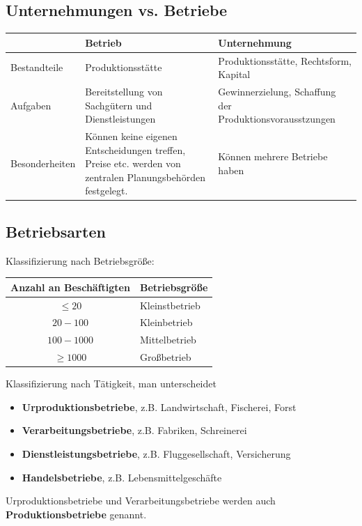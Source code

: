 \documentclass[titlepage,parskip=half]{scrartcl}
\begin{document}
\subsection{Unternehmungen vs. Betriebe}
\begin{tabularx}{\textwidth}{|l|X|X|} \hline
    & Betrieb & Unternehmung \\ \hline
    Bestandteile & Produktionsstätte & Produktionsstätte, Rechtsform, Kapital \\ \hline
    Aufgaben & Bereitstellung von Sachgütern und Dienstleistungen & Gewinnerzielung, Schaffung der Produktionsvorausstzungen \\ \hline
    Besonderheiten & Können keine eigenen Entscheidungen treffen, Preise etc. werden von zentralen Planungsbehörden festgelegt. & Können mehrere Betriebe haben \\ \hline
\end{tabularx}

\subsection{Betriebsarten}
Klassifizierung nach Betriebsgröße:

\begin{tabular}{|c|l|} \hline
    Anzahl an Beschäftigten & Betriebsgröße \\ \hline
    $\le20$ & Kleinstbetrieb  \\ \hline
    $20-100$ & Kleinbetrieb \\ \hline
    $100-1000$ & Mittelbetrieb \\ \hline
    $\ge1000$ & Großbetrieb \\ \hline
\end{tabular}

Klassifizierung nach Tätigkeit, man unterscheidet
\begin{itemize}
    \item \textbf{Urproduktionsbetriebe}, z.B. Landwirtschaft, Fischerei, Forst
    \item \textbf{Verarbeitungsbetriebe}, z.B. Fabriken, Schreinerei
    \item \textbf{Dienstleistungsbetriebe}, z.B. Fluggesellschaft, Versicherung
    \item \textbf{Handelsbetriebe}, z.B. Lebensmittelgeschäfte
\end{itemize}

Urproduktionsbetriebe und Verarbeitungsbetriebe werden auch \textbf{Produktionsbetriebe} genannt.
\end{document}
